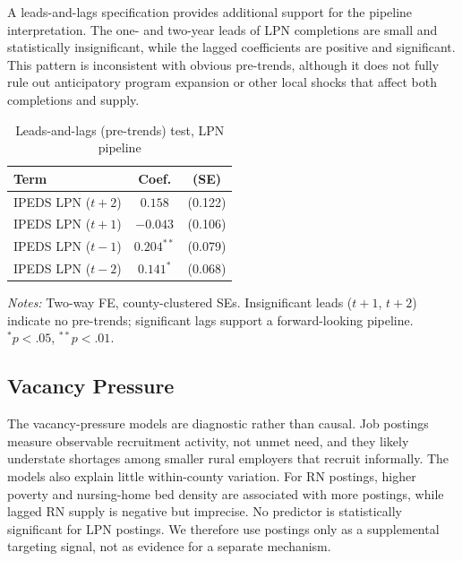 \documentclass[12pt]{article}
\begin{document}
A leads-and-lags specification provides additional support for the pipeline
interpretation. The one- and two-year leads of LPN completions are small and
statistically insignificant, while the lagged coefficients are positive and
significant. This pattern is inconsistent with obvious pre-trends, although
it does not fully rule out anticipatory program expansion or other local
shocks that affect both completions and supply.

\begin{table}[!htbp]
\centering
\caption{Leads-and-lags (pre-trends) test, LPN pipeline}
\label{tab:pretrends}
\small
\begin{tabular}{lcc}
\toprule
Term & Coef. & (SE) \\
\midrule
IPEDS LPN ($t+2$) & $0.158$ & (0.122) \\
IPEDS LPN ($t+1$) & $-0.043$ & (0.106) \\
IPEDS LPN ($t-1$) & $0.204^{**}$ & (0.079) \\
IPEDS LPN ($t-2$) & $0.141^{*}$ & (0.068) \\
\bottomrule
\end{tabular}
\par\medskip\footnotesize\textit{Notes:} Two-way FE, county-clustered SEs. Insignificant leads ($t+1$, $t+2$) indicate no pre-trends; significant lags support a forward-looking pipeline. $^{*}p<.05$, $^{**}p<.01$.
\end{table}

\subsection{Vacancy Pressure}

The vacancy-pressure models are diagnostic rather than causal. Job postings
measure observable recruitment activity, not unmet need, and they likely
understate shortages among smaller rural employers that recruit informally.
The models also explain little within-county variation. For RN postings,
higher poverty and nursing-home bed density are associated with more
postings, while lagged RN supply is negative but imprecise. No predictor is
statistically significant for LPN postings. We therefore use postings only
as a supplemental targeting signal, not as evidence for a separate
mechanism.
\end{document}
